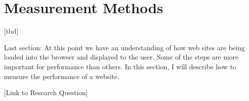 









\section{Measurement Methods}


[tbd]


Last section: At this point we have an understanding of how web sites are being loaded into the browser and displayed to the user.
Some of the steps are more important for performance than others.
In this section, I will describe how to measure the performance of a website.


[Link to Research Question]



